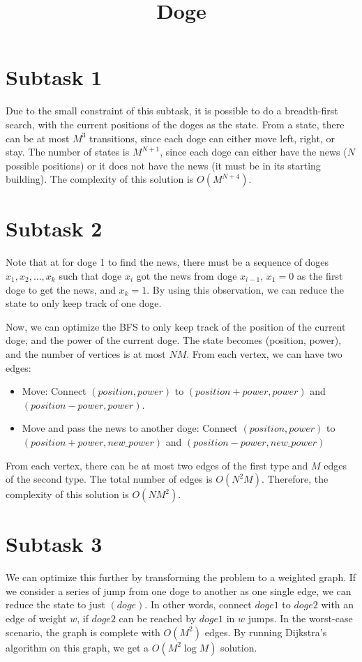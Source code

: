 \documentclass[a4paper,11pt]{article}
\title{Doge}
\begin{document}
\maketitle
\section{Subtask 1}
Due to the small constraint of this subtask, it is possible to do a breadth-first search, with the current positions of the doges as the state. From a state, there can be at most $M^3$ transitions, since each doge can either move left, right, or stay. The number of states is $M^{N+1}$, since each doge can either have the news ($N$ possible positions) or it does not have the news (it must be in its starting building). The complexity of this solution is $O(M^{N+4})$.
\section{Subtask 2}
Note that at for doge 1 to find the news, there must be a sequence of doges ${x_1, x_2, \ldots, x_k}$ such that doge $x_i$ got the news from doge $x_{i-1}$, $x_1 = 0$ as the first doge to get the news, and $x_k = 1$. By using this observation, we can reduce the state to only keep track of one doge.

Now, we can optimize the BFS to only keep track of the position of the current doge, and the power of the current doge. The state becomes (position, power), and the number of vertices is at most $NM$. From each vertex, we can have two edges:
\begin{itemize}
    \item Move: Connect $(position, power)$ to $(position + power, power)$ and $(position - power, power)$.
    \item Move and pass the news to another doge: Connect $(position, power)$ to $(position + power, new\_ power)$ and $(position - power, new\_ power)$
\end{itemize}
From each vertex, there can be at most two edges of the first type and $M$ edges of the second type. The total number of edges is $O(N^2M)$. Therefore, the complexity of this solution is $O(NM^2)$.

\section{Subtask 3}
We can optimize this further by transforming the problem to a weighted graph.
If we consider a series of jump from one doge to another as one single edge, we can reduce the state to just $(doge)$. In other words, connect $doge1$ to $doge2$ with an edge of weight $w$, if $doge2$ can be reached by $doge1$ in $w$ jumps. In the worst-case scenario, the graph is complete with $O(M^2)$ edges. By running Dijkstra's algorithm on this graph, we get a $O(M^2 \log M)$ solution.
\end{document}
